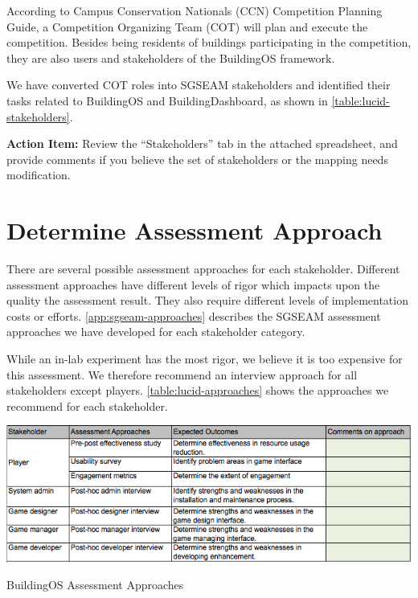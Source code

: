 \documentclass[11pt,oneside]{book}
\begin{document}
According to Campus Conservation Nationals (CCN) Competition Planning
Guide, a Competition Organizing Team (COT) will plan and
execute the competition. Besides being residents of buildings
participating in the competition, they are also users and stakeholders
of the BuildingOS framework. 

We have converted COT roles into SGSEAM stakeholders and identified their tasks related to BuildingOS and
BuildingDashboard, as shown in
\autoref{table:lucid-stakeholders}. 

\begin{shadebox}
{\bf Action Item:} Review the ``Stakeholders'' tab in the
attached spreadsheet, and provide comments if you believe the set of
stakeholders or the mapping needs modification.
\end{shadebox}


\section{Determine Assessment Approach}
\label{sect:Assessment Approach}

There are several possible assessment approaches for each
stakeholder. Different assessment approaches have different levels of
rigor which impacts upon the quality the assessment
result. They also require different levels of 
implementation costs or efforts. \autoref{app:sgseam-approaches}
describes the SGSEAM assessment approaches we have developed for each
stakeholder category.

While an in-lab experiment has the most rigor, we believe it is too
expensive for this assessment. We therefore recommend an
interview approach for all stakeholders except
players. \autoref{table:lucid-approaches} shows the approaches we recommend
for each stakeholder.
 
\begin{table}[ht!]
  \center
  \includegraphics[width=0.9\columnwidth]{approach}
  \caption{BuildingOS Assessment Approaches}
  \label{table:lucid-approaches}
\end{table}
\end{document}
